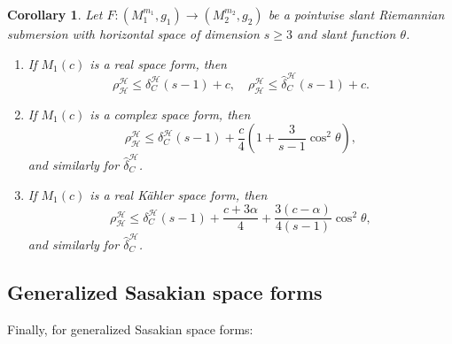 \documentclass[11pt]{amsart}
\theoremstyle{plain}
\newtheorem{corollary}{Corollary}[section]
\theoremstyle{definition}
\theoremstyle{remark}
\newcommand{\calH}{\mathcal{H}}
\begin{document}
\begin{corollary}\label{cor:subm_horiz_real}
Let $F:(M_1^{m_1},g_1)\to (M_2^{m_2},g_2)$ be a pointwise slant Riemannian submersion with horizontal space of dimension $s\ge 3$ and slant function $\theta$.
\begin{enumerate}
    \item If $M_1(c)$ is a real space form, then
    \[\rho_{\calH}^{\calH} \le \delta_C^{\calH}(s-1) + c, \quad \rho_{\calH}^{\calH} \le \hat{\delta}_C^{\calH}(s-1) + c.\]
    
    \item If $M_1(c)$ is a complex space form, then
    \[\rho_{\calH}^{\calH} \le \delta_C^{\calH}(s-1) + \dfrac{c}{4}\left(1 + \dfrac{3}{s-1}\cos^2\theta\right),\]
    and similarly for $\hat{\delta}_C^{\calH}$.\\
    
    \item If $M_1(c)$ is a real K\"{a}hler space form, then
    \[\rho_{\calH}^{\calH} \le \delta_C^{\calH}(s-1) + \dfrac{c+3\alpha}{4} + \dfrac{3(c-\alpha)}{4(s-1)}\cos^2\theta,\]
    and similarly for $\hat{\delta}_C^{\calH}$.
\end{enumerate}
\end{corollary}

\subsection{Generalized Sasakian space forms}

Finally, for generalized Sasakian space forms:
\end{document}
